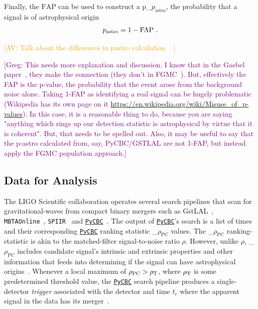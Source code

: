 \documentclass[%
 nofootinbib,
 amsmath,amssymb,
 aps,
 twocolumn,
 superscriptaddress
]{revtex4-2}
\newcommand{\gstlal}{{\sc GstLAL}\xspace}
\newcommand{\pycbc}{{\sc \href{https://pycbc.org/}{\texttt{PyCBC}}}\xspace}
\newcommand{\fancytext}[1]{{\relax\ifmmode#1\else $#1$\fi}\xspace}
\newcommand{\mathcmd}[1]{{\sc \relax\ifmmode#1\else $#1$\fi}\xspace}
\newcommand{\pycbcstat}{\mathcmd{\rho_\text{PC}}}
\newcommand{\snr}{\mathcmd{\rho}}
\newcommand{\fap}{\mathcmd{\text{FAP}}}
\newcommand{\pastro}{\fancytext{p_\text{astro}}}
\newcommand{\avi}[1]{\textcolor{orange}{[AV: #1]}}
\newcommand{\greg}[1]{\textcolor{purple}{[Greg: #1]}}
\begin{document}
Finally, the \fap can be used to construct a \pastro, the probability that a signal is of astrophysical origin~\cite{pastro_1,pastro_2,pastro_3}
\begin{equation}
    \pastro = 1 -  \fap \ .
\end{equation}

\avi{
Talk about the differences in pastro calculation ~\cite{Farr:2015:PhRvD, Gaebel:2019:MNRAS,Galaudage:2020:PhRvD}
}

\greg{This needs more explanation and discussion. I know that in the Gaebel paper~\cite{Gaebel:2019:MNRAS}, they make the connection (they don't in FGMC~\cite{Farr:2015:PhRvD}). But, effectively the FAP is the p-value, the probability that the event arose from the background noise alone. Taking 1-FAP as identifying a real signal can be hugely problematic (Wikipedia has its own page on it \url{https://en.wikipedia.org/wiki/Misuse_of_p-values}). In this case, it is a reasonable thing to do, because you are saying "anything which rings up our detection statistic is astrophysical by virtue that it is coherent". But, that needs to be spelled out. Also, it may be useful to say that the p-astro calculated from, say, PyCBC/GSTLAL are not 1-FAP, but instead apply the FGMC population approach.}


\subsection{Data for Analysis}
The LIGO Scientific collaboration operates several search pipelines that scan for gravitational-waves from compact binary mergers such as \gstlal~\cite{sachdev2019gstlal}, \texttt{MBTAOnline}~\cite{MBTA}, \texttt{SPIIR}~\cite{spiir} and \pycbc~\cite{pycbc_og4}. The output of \pycbc's search is a list of times and their corresponding \pycbc ranking statistic \pycbcstat values. The \pycbcstat ranking-statistic is akin to the matched-filter signal-to-noise ratio \snr. However, unlike \snr, \pycbcstat includes candidate signal's intrinsic and extrinsic properties and other information that feeds into determining if the signal can have astrophysical origins~\cite{pycbc_og6}. Whenever a local maximum of $\pycbcstat > \snr_\text{T}$, where $\snr_\text{T}$ is some predetermined threshold value, the \pycbc search pipeline produces a single-detector \textit{trigger} associated with the detector and time $t_c$ where the apparent signal in the data has its merger~\cite{pycbc_og6}.
\end{document}
